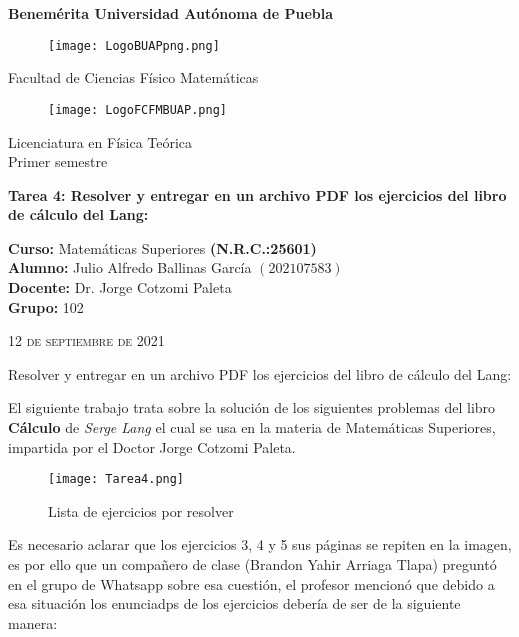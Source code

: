 \documentclass[12pt]{article}
\begin{document}
\thispagestyle{empty} 
\begin{center} \LARGE{\bf Benemérita Universidad Autónoma de Puebla} \\[0.5cm]
\begin{figure}[htb] \centering \texttt{[image: LogoBUAPpng.png]} \end{figure}
\LARGE{Facultad de Ciencias Físico Matemáticas}\\[0.5cm]
\begin{figure}[htb] \centering \texttt{[image: LogoFCFMBUAP.png]} \end{figure} 
\Large{Licenciatura en Física Teórica}\\[0.5cm]
\large{Primer semestre} \end{center}
\begin{center} { \Large \bfseries{Tarea 4: Resolver y entregar en un archivo PDF los ejercicios del libro de cálculo del Lang:}} \\ \end{center}
\large{\bf Curso: } Matemáticas Superiores \textbf{(N.R.C.:25601)}\\
\large{\bf Alumno:} Julio Alfredo Ballinas García $\left(202107583\right)$ \\
\large{\bf Docente:} Dr. Jorge Cotzomi Paleta\\
\large{\bf Grupo:} 102\\ \begin{center} 
\vfill
\textsc{12 de septiembre de 2021} \end{center}  
\newpage



\begin{center}
\Large{Resolver y entregar en un archivo PDF los ejercicios del libro de cálculo del Lang:} 
\end{center}
\sffamily
El siguiente trabajo trata sobre la solución de los siguientes problemas del libro \textbf{Cálculo} de  
\textit{Serge Lang} el cual se usa en la materia de Matemáticas Superiores, impartida por el Doctor Jorge Cotzomi Paleta.

\begin{figure}[htb] \centering \texttt{[image: Tarea4.png]}
\caption{Lista de ejercicios por resolver}   
\end{figure}

\sffamily
Es necesario aclarar que los ejercicios 3, 4 y 5 sus páginas se repiten en la imagen, es por ello que un compañero de clase (Brandon Yahir Arriaga Tlapa) preguntó en el grupo de Whatsapp sobre esa cuestión, el profesor mencionó que debido a esa situación los enunciadps de los ejercicios debería de ser de la siguiente manera:
\end{document}
